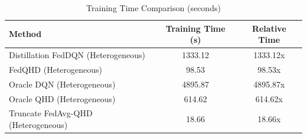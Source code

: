 \begin{table}[t]
\centering
\caption{Training Time Comparison (seconds)}
\label{tab:computation_cost}
\begin{tabular}{lcc}
\toprule
Method & Training Time (s) & Relative Time \\
\midrule
Distillation FedDQN (Heterogeneous) & 1333.12 & 1333.12x \\
FedQHD (Heterogeneous) & 98.53 & 98.53x \\
Oracle DQN (Heterogeneous) & 4895.87 & 4895.87x \\
Oracle QHD (Heterogeneous) & 614.62 & 614.62x \\
Truncate FedAvg-QHD (Heterogeneous) & 18.66 & 18.66x \\
\bottomrule
\end{tabular}
\end{table}